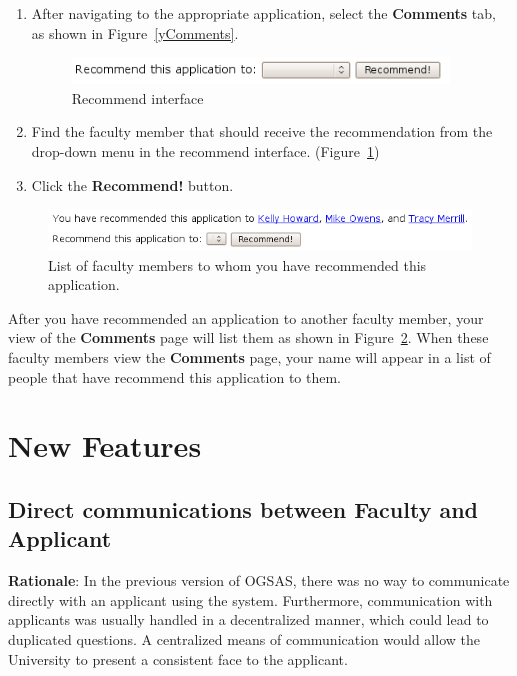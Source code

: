 \documentclass[titlepage]{article}
\begin{document}
\begin{enumerate}
  \item After navigating to the appropriate application, select the
    \textbf{\textsf{Comments}} tab, as shown in Figure~\ref{yComments}.

\begin{figure}[h!]
  \begin{center}
    \includegraphics[width=10cm]{recommend.png}
  \end{center}
  \caption{Recommend interface}
  \label{yRecommend}
\end{figure}

  \item Find the faculty member that should receive the recommendation from
    the drop-down menu in the recommend interface. (Figure~\ref{yRecommend})
  \item Click the \textbf{\textsf{Recommend!}} button.
\end{enumerate}

\begin{figure}[h!]
  \begin{center}
    \includegraphics[width=13cm]{sentrecommend.png}
  \end{center}
  \caption{List of faculty members to whom you have recommended this
    application.}
  \label{ySentRecommend}
\end{figure}

After you have recommended an application to another faculty member, your view
of the \textbf{\textsf{Comments}} page will list them as shown in
Figure~\ref{ySentRecommend}. When these faculty members view the
\textbf{\textsf{Comments}} page, your name will appear in a list of people that have
recommend this application to them.

\newpage
\section{New Features}
\setcounter{figure}{0}

\subsection{Direct communications between Faculty and Applicant}
\textbf{Rationale}: In the previous version of OGSAS, there was no way to communicate directly with an applicant using the system. Furthermore, communication with applicants was usually handled in a decentralized manner, which could lead to duplicated questions. A centralized means of communication would allow the University to present a consistent face to the applicant.
\end{document}
